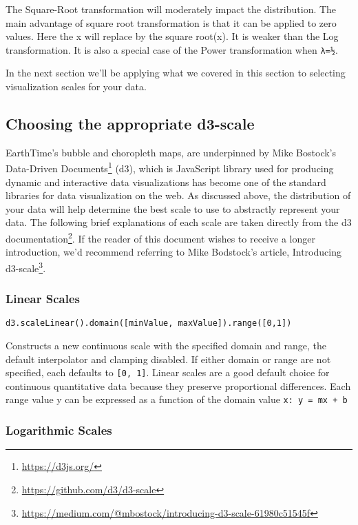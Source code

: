 \documentclass[
  12pt,
]{krantz}
\renewcommand{\href}[2]{#2\footnote{\url{#1}}}
\begin{document}
The Square-Root transformation will moderately impact the distribution. The main advantage of square root transformation is that it can be applied to zero values. Here the x will replace by the square root(x). It is weaker than the Log transformation. It is also a special case of the Power transformation when \texttt{λ=½}.

In the next section we'll be applying what we covered in this section to selecting visualization scales for your data.

\hypertarget{choosing-the-appropriate-d3-scale}{%
\subsection{Choosing the appropriate d3-scale}\label{choosing-the-appropriate-d3-scale}}

EarthTime's bubble and choropleth maps, are underpinned by Mike Bostock's \href{https://d3js.org/}{Data-Driven Documents} (d3), which is JavaScript library used for producing dynamic and interactive data visualizations has become one of the standard libraries for data visualization on the web. As discussed above, the distribution of your data will help determine the best scale to use to abstractly represent your data. The following brief explanations of each scale are taken directly from the \href{https://github.com/d3/d3-scale}{d3 documentation}. If the reader of this document wishes to receive a longer introduction, we'd recommend referring to Mike Bodstock's article, \href{https://medium.com/@mbostock/introducing-d3-scale-61980c51545f}{Introducing d3-scale}.

\hypertarget{linear-scales}{%
\subsubsection*{Linear Scales}\label{linear-scales}}


\texttt{d3.scaleLinear().domain({[}minValue,\ maxValue{]}).range({[}0,1{]})}

Constructs a new continuous scale with the specified domain and range, the default interpolator and clamping disabled. If either domain or range are not specified, each defaults to \texttt{{[}0,\ 1{]}}. Linear scales are a good default choice for continuous quantitative data because they preserve proportional differences. Each range value y can be expressed as a function of the domain value \texttt{x:\ y\ =\ mx\ +\ b}

\hypertarget{logarithmic-scales}{%
\subsubsection*{Logarithmic Scales}\label{logarithmic-scales}}
\end{document}
